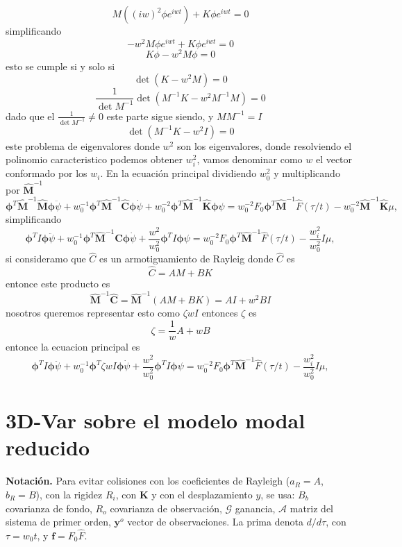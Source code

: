 \[
M \left((iw)^2\phi e^{iwt}\right)+K \phi e^{iwt}=0
\]
simplificando
\[
-w^2 M \phi e^{iwt}+K \phi e^{iwt}=0
\]
\[
K \phi-w^2 M \phi  =0
\]
esto se cumple si y solo si
\[
\det (K -w^2 M )=0
\]
\[
\frac{1}{\det{M^{-1}}}\det (M^{-1} K  -w^2 M^{-1} M  )=0
\]
dado que el
$\frac{1}{\det{M^{-1}}} \neq 0$
este parte sigue siendo, y $M M^{-1}=I$
\[
\det (M^{-1} K  -w^2 I )=0
\]
este problema de eigenvalores donde $w^2$ son los eigenvalores, donde resolviendo el polinomio caracteristico
podemos obtener $w_i^2$, vamos denominar como $w$ el vector conformado por los $w_i$. En la ecuación principal
dividiendo $w_0^2$ y multiplicando por $\hat{\mathbf{M}}^{-1}$
\[
 \mathbf{\phi}^T \hat{\mathbf{M}}^{-1} \hat{\mathbf{M}} \mathbf{\phi} \ddot \psi + w_0^{-1} \mathbf{\phi}^T \hat{\mathbf{M}}^{-1}\hat{\mathbf{C}} \mathbf{\phi} \dot \psi  +w_0^{-2}\mathbf{\phi}^T \hat{\mathbf{M}}^{-1}\hat{\mathbf{K}} \mathbf{\phi} \psi=w_0^{-2}F_0 \mathbf{\phi}^T\hat{\mathbf{M}}^{-1} \hat{F}(\tau/t)-w_0^{-2}\hat{\mathbf{M}}^{-1}\hat{\mathbf{K}}\mu,
\]
simplificando
\[
 \mathbf{\phi}^T I \mathbf{\phi} \ddot \psi + w_0^{-1} \mathbf{\phi}^T \hat{\mathbf{M}}^{-1}\hat{\mathbf{C}} \mathbf{\phi} \dot \psi  +\frac{w^2}{w_0^{2}}\mathbf{\phi}^T I \mathbf{\phi} \psi=w_0^{-2}F_0 \mathbf{\phi}^T\hat{\mathbf{M}}^{-1} \hat{F}(\tau/t)-\frac{w_i^2}{w_0^{2}}I\mu,
\]
si consideramo que $\hat{C}$ es un armotiguamiento de Rayleig donde  $\hat{C}$ es
\[
\hat{C}=A M+B K
\]
entonce este producto es
\[
\hat{\mathbf{M}}^{-1}\hat{\mathbf{C}}=\hat{\mathbf{M}}^{-1}(A M+B K)=A I+w^2 B I
\]
nosotros queremos representar esto como $\zeta w I$ entonces $\zeta$ es
\[
\zeta = \frac{1}{w}A +w B 
\] 
entonce la ecuacion principal es
\[
 \mathbf{\phi}^T I \mathbf{\phi} \ddot \psi + w_0^{-1} \mathbf{\phi}^T \zeta w I \mathbf{\phi} \dot \psi  +\frac{w^2}{w_0^{2}}\mathbf{\phi}^T I \mathbf{\phi} \psi=w_0^{-2}F_0 \mathbf{\phi}^T\hat{\mathbf{M}}^{-1} \hat{F}(\tau/t)-\frac{w_i^2}{w_0^{2}}I\mu,
\]

\section{3D-Var sobre el modelo modal reducido}

\textbf{Notación.} Para evitar colisiones con los coeficientes de Rayleigh ($a_R=A$, $b_R=B$), con la rigidez $R_i$, con $\mathbf K$ y con el desplazamiento $y$, se usa: $B_b$ covarianza de fondo, $R_o$ covarianza de observación, $\mathcal G$ ganancia, $\mathcal A$ matriz del sistema de primer orden, $\mathbf y^o$ vector de observaciones. La prima denota $d/d\tau$, con $\tau=w_0t$, y $\mathbf f=F_0\hat F$.

